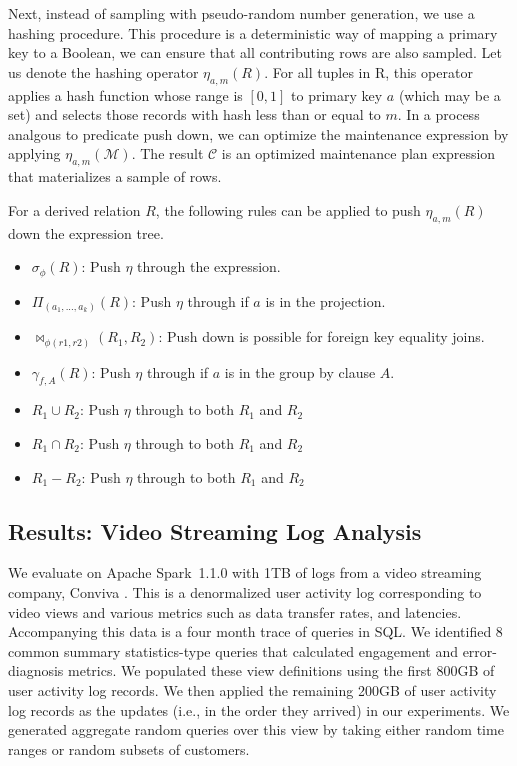 Next, instead of sampling with pseudo-random number generation, we use a hashing procedure.
This procedure is a deterministic way of mapping a primary key to a Boolean, we can ensure that all contributing rows are also sampled. 
Let us denote the hashing operator $\eta_{a, m}(R)$. 
For all tuples in R, this operator applies a hash function whose range is $[0,1]$ to primary key $a$ (which may be a set) and selects those records with hash less than or equal to $m$.
In a process analgous to predicate push down, we can optimize the maintenance expression by applying $\eta_{a, m}(\mathcal{M})$.
The result $\mathcal{C}$ is an optimized maintenance plan expression that materializes a sample of rows.

\begin{definition}
For a derived relation $R$, the following rules can be applied to push $\eta_{a, m}(R)$ down the expression tree. 
\begin{itemize}[noitemsep]
\item $\sigma_{\phi}(R)$: Push $\eta$ through the expression.  
\item $\Pi_{(a_1,...,a_k)}(R)$: Push $\eta $ through if $a$ is in the projection.
\item $\bowtie_{\phi (r1,r2)}(R_1,R_2)$: Push down is possible for foreign key equality joins.
\item $\gamma_{f,A}(R)$: Push $\eta $ through if $a$ is in the group by clause $A$.
\item $R_1 \cup R_2$: Push $\eta $ through to both $R_1$ and $R_2$
\item $R_1 \cap R_2$: Push $\eta $ through to both $R_1$ and $R_2$
\item $R_1 - R_2$: Push $\eta $ through to both $R_1$ and $R_2$
\end{itemize}
\end{definition}

\subsection{Results: Video Streaming Log Analysis}
We evaluate \svc on Apache Spark~1.1.0 with 1TB of logs from a video streaming company, Conviva \cite{conviva}.
This is a denormalized user activity log corresponding to video views and various metrics such as data transfer rates, and latencies.
Accompanying this data is a four month trace of queries in SQL.
We identified 8 common summary statistics-type queries that calculated engagement and error-diagnosis metrics.
We populated these view definitions using the first 800GB of user activity log records.  
We then applied the remaining 200GB of user activity log records as the updates (i.e., in the order they arrived) in our experiments.
We generated aggregate random queries over this view by taking either random time ranges or random subsets of customers.

